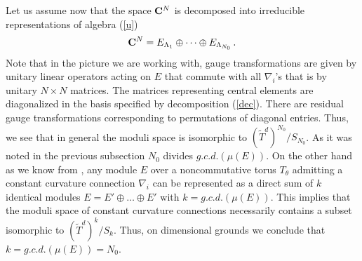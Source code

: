 \documentclass[a4paper,a4paper]{article}
\begin{document}
Let us assume now that the space   ${\bf C}^{N}$ is decomposed into irreducible representations of algebra (\ref{u})
\begin{equation} \label{dec}
{\bf C}^{N} = E_{\Lambda_{1}}\oplus \dots \oplus E_{\Lambda_{N_{0}}}\, .
\end{equation}
Note that in the picture we are working with,  gauge transformations are given by unitary linear operators acting on $E$ that 
commute with all $\nabla_{i}$'s that is by unitary $N\times N$ matrices.  
 The matrices representing central elements are diagonalized in the basis specified by  decomposition (\ref{dec}). 
There are residual gauge transformations corresponding to permutations of diagonal entries. Thus, we see that in  general 
 the moduli space is isomorphic to $(\tilde T^{d})^{N_{0}}/S_{N_{0}}$. 
As it was noted   in the previous subsection $N_{0}$ divides $g.c.d. (\mu(E))$.
On the other hand as we know from \cite{AstSchw}, \cite{KS} any module $E$ over a noncommutative torus $T_{\theta}$ 
admitting a constant curvature connection $\nabla_{i}$ 
can be represented as a direct sum of $k$ identical modules  $ E=E'\oplus \dots \oplus E' $ with 
$k=g.c.d.(\mu(E))$. This implies that the moduli space of constant curvature connections necessarily contains 
a subset isomorphic to $(\tilde T^{d})^{k}/S_{k}$. Thus, on dimensional grounds we conclude that $k=g.c.d.(\mu(E))=N_{0}$. 


\end{document}
